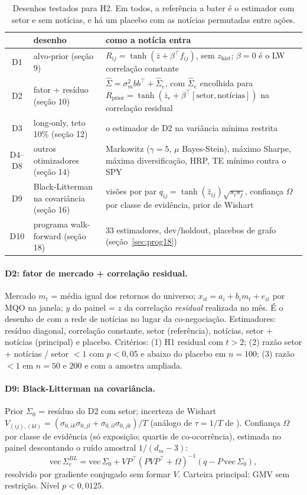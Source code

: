 \documentclass[11pt,a4paper]{article}
\newcommand{\Sig}{\hat\Sigma}
\begin{document}
\begin{table}[h]
\centering\small
\begin{tabularx}{\textwidth}{clL}
\toprule
& desenho & como a notícia entra \\
\midrule
D1 & alvo-prior (seção 9) & $R_{ij}=\tanh(\bar z+\beta^\top f_{ij})$, sem $z_{\text{hist}}$; $\beta=0$ é o LW correlação constante \\
D2 & fator + resíduo (seção 10) & $\Sig=\sigma^2_m bb^\top+\Sig_e$, com $\Sig_e$ encolhida para $R_{\text{prior}}=\tanh(\bar z_e+\beta^\top[\text{setor},\text{notícias}])$ na correlação residual \\
D3 & long-only, teto 10\% (seção 12) & o estimador de D2 na variância mínima restrita \\
D4--D8 & outros otimizadores (seção 14) & Markowitz ($\gamma=5$, $\mu$ Bayes-Stein), máximo Sharpe, máxima diversificação, HRP, TE mínimo contra o SPY \\
D9 & Black-Litterman na covariância (seção 16) & visões por par $q_{ij}=\tanh(\hat z_{ij})\sqrt{s_is_j}$, confiança $\Omega$ por classe de evidência, prior de Wishart \\
D10 & programa walk-forward (seção 18) & 33 estimadores, dev/holdout, placebos de grafo (seção~\ref{sec:prog18}) \\
\bottomrule
\end{tabularx}
\caption{Desenhos testados para H2. Em todos, a referência a bater é o estimador com setor e sem notícias, e há um placebo com as notícias permutadas entre ações.}
\end{table}

\paragraph{D2: fator de mercado + correlação residual.} Mercado $m_t$ = média igual dos retornos do
universo; $x_{it}=a_i+b_im_t+e_{it}$ por MQO na janela; $y$ do painel = $z$ da correlação
\emph{residual} realizada no mês. É o desenho de \citet{lu2023} com a rede de notícias no lugar da
co-negociação. Estimadores: resíduo diagonal, correlação constante, setor (referência), notícias,
setor + notícias (principal) e placebo. Critérios: (1) H1 residual com $t>2$; (2) razão setor + notícias
/ setor $<1$ com $p<0{,}05$ e abaixo do placebo em $n=100$; (3) razão $<1$ em $n=50$ e $200$ e com a
amostra ampliada.

\paragraph{D9: Black-Litterman na covariância.} Prior $\Sigma_0$ = resíduo do D2 com setor;
incerteza de Wishart $V_{(ij),(kl)}=(\sigma_{0,ik}\sigma_{0,jl}+\sigma_{0,il}\sigma_{0,jk})/T$ (análogo
de $\tau=1/T$ de \citealt{he1999}). Confiança $\Omega$ por classe de evidência (só exposição; quartis de
co-ocorrência), estimada no painel descontando o ruído amostral $1/(d_m-3)$:
\[
\mathrm{vec}\,\Sigma^{BL}_e=\mathrm{vec}\,\Sigma_0+VP^\top(PVP^\top+\Omega)^{-1}(q-P\,\mathrm{vec}\,\Sigma_0),
\]
resolvido por gradiente conjugado sem formar $V$. Carteira principal: GMV sem restrição. Nível
$p<0{,}0125$.
\end{document}
